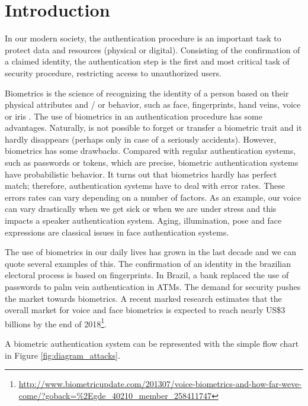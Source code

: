 \chapter{Introduction}
\label{chap:introduction}

In our modern society, the authentication procedure is an important task to protect data and resources (physical or digital). Consisting of the confirmation of a claimed identity, the authentication step is the first and most critical task of security procedure, restricting access to unauthorized users. 

Biometrics is the science of recognizing the identity of a person based on their physical attributes and / or behavior, such as face, fingerprints, hand veins, voice or iris \cite{li2011handbook}. The use of biometrics in an authentication procedure has some advantages. Naturally, is not possible to forget or transfer a biometric trait and it hardly disappears (perhaps only in case of a seriously accidents). However, biometrics has some drawbacks. Compared with regular authentication systems, such as passwords or tokens, which are precise, biometric authentication systems have probabilistic behavior. It turns out that biometrics hardly has perfect match; therefore, authentication systems have to deal with error rates. These errors rates can vary depending on a number of factors. As an example, our voice can vary drastically  when we get sick or when we are under stress and this impacts a speaker authentication system. Aging, illumination, pose and face expressions are classical issues in face authentication systems.


The use of biometrics in our daily lives has grown in the last decade and we can quote several examples of this. The confirmation of an identity in the brazilian electoral process is based on fingerprints. In Brazil, a bank replaced the use of passwords to palm vein authentication in ATMs. The demand for security pushes the market towards biometrics. A recent marked research estimates that the overall market for voice and face biometrics is expected to reach nearly US\$3 billions by the end of 2018\footnote{\url{http://www.biometricupdate.com/201307/voice-biometrics-and-how-far-weve-come/?goback=\%2Egde\_40210\_member\_258411747}}.


A biometric authentication system can be represented with the simple flow chart in Figure \ref{fig:diagram_attacks}.

